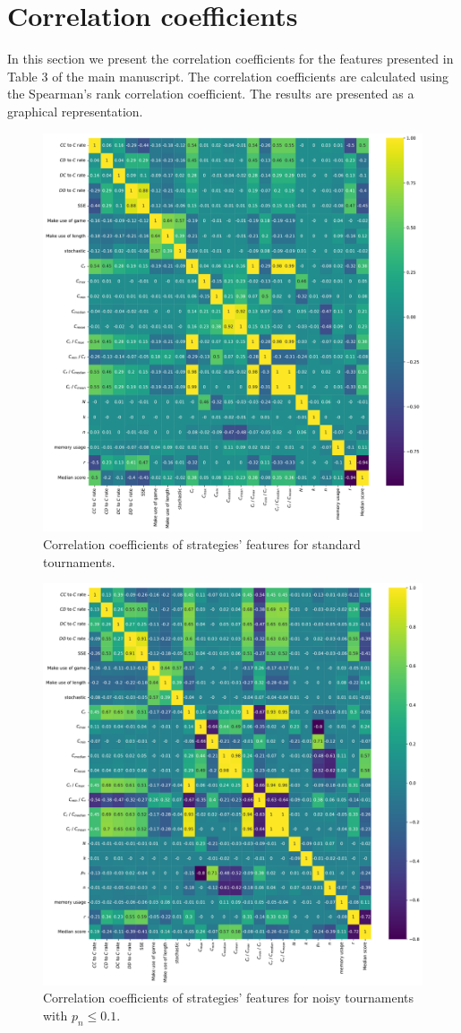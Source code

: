 \section{Correlation coefficients}\label{app:correlations}

In this section we present the correlation coefficients for the features
presented in Table 3 of the main manuscript. The correlation coefficients
are calculated using the Spearman's rank correlation coefficient. The results
are presented as a graphical representation.

\begin{figure}[!htbp]
        \begin{center}
            \includegraphics[width=.75\linewidth]{../images/standard_correlation_plot.pdf}
        \end{center}
        \caption{Correlation coefficients of strategies' features for standard tournaments.}
\end{figure}
\begin{figure}[!htbp]
    \begin{center}
        \includegraphics[width=.75\linewidth]{../images/subset_noise_correlation_plot.pdf}
    \end{center}
    \caption{Correlation coefficients of strategies' features for noisy tournaments with $p_n \leq 0.1$.}
\end{figure}
